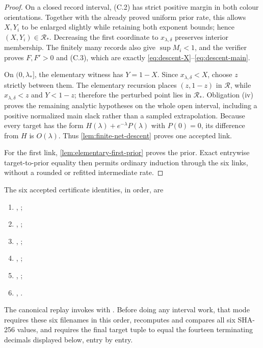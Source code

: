 \begin{proof}
On a closed record interval, (C.2) has strict positive margin in both colour
orientations.  Together with the already proved uniform prior rate, this
allows \(X,Y_i\) to be enlarged slightly while retaining both exponent
bounds; hence \((X,Y_i)\in\mathcal R_*\).  Decreasing the first coordinate to
\(x_{\lambda,\delta}\) preserves interior membership.  The finitely many
records also give \(\sup M_i<1\), and the verifier proves \(F,F'>0\) and
(C.3), which are exactly \eqref{eq:descent-X}--\eqref{eq:descent-main}.

On \((0,\lambda_*]\), the elementary witness has \(Y=1-X\).  Since
\(x_{\lambda,\delta}<X\), choose \(z\) strictly between them.  The elementary
recursion places \((z,1-z)\) in \(\mathcal R\), while
\(x_{\lambda,\delta}<z\) and \(Y<1-z\); therefore the perturbed point lies
in \(\mathcal R_*\).  Obligation (iv) proves the remaining analytic
hypotheses on the whole open interval, including a positive normalized main
slack rather than a sampled extrapolation.  Because every target has the form
\(H(\lambda)+e^{-\lambda}P(\lambda)\) with \(P(0)=0\), its difference from
\(H\) is \(O(\lambda)\).  Thus \cref{lem:finite-net-descent} proves one
accepted link.

For the first link, \cref{lem:elementary-first-prior} proves the prior.  Exact
entrywise target-to-prior equality then permits ordinary induction through
the six links, without a rounded or refitted intermediate rate.
\end{proof}

The six accepted certificate identities, in order, are
\begin{enumerate}[label=\arabic*.]
\item {},
;
\item {},
;
\item {},
;
\item {},
;
\item {},
;
\item {},
.
\end{enumerate}
The canonical replay invokes  with
.  Before doing any interval work, that mode
requires these six filenames in this order, recomputes and compares all six
SHA-256 values, and requires the final target tuple to equal the fourteen
terminating decimals displayed below, entry by entry.

